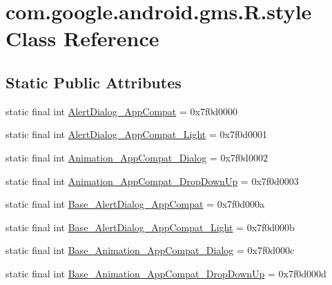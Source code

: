 \hypertarget{classcom_1_1google_1_1android_1_1gms_1_1R_1_1style}{}\section{com.\+google.\+android.\+gms.\+R.\+style Class Reference}
\label{classcom_1_1google_1_1android_1_1gms_1_1R_1_1style}
\subsection*{Static Public Attributes}
\begin{DoxyCompactItemize}
\item 
static final int \mbox{\hyperlink{classcom_1_1google_1_1android_1_1gms_1_1R_1_1style_a655dde196110073187ff00b97ed4ad4a}{Alert\+Dialog\+\_\+\+App\+Compat}} = 0x7f0d0000
\item 
static final int \mbox{\hyperlink{classcom_1_1google_1_1android_1_1gms_1_1R_1_1style_afb60526c8ffabe0efffdf437fb9e2977}{Alert\+Dialog\+\_\+\+App\+Compat\+\_\+\+Light}} = 0x7f0d0001
\item 
static final int \mbox{\hyperlink{classcom_1_1google_1_1android_1_1gms_1_1R_1_1style_a4757a69c9c723414d81b337acc35c729}{Animation\+\_\+\+App\+Compat\+\_\+\+Dialog}} = 0x7f0d0002
\item 
static final int \mbox{\hyperlink{classcom_1_1google_1_1android_1_1gms_1_1R_1_1style_aa89ffcc7d49bea616677fe633b17c625}{Animation\+\_\+\+App\+Compat\+\_\+\+Drop\+Down\+Up}} = 0x7f0d0003
\item 
static final int \mbox{\hyperlink{classcom_1_1google_1_1android_1_1gms_1_1R_1_1style_a880e9945afa2cc56928e60ce1dc31da6}{Base\+\_\+\+Alert\+Dialog\+\_\+\+App\+Compat}} = 0x7f0d000a
\item 
static final int \mbox{\hyperlink{classcom_1_1google_1_1android_1_1gms_1_1R_1_1style_acc30d307172ee1bb23928ab78163dddd}{Base\+\_\+\+Alert\+Dialog\+\_\+\+App\+Compat\+\_\+\+Light}} = 0x7f0d000b
\item 
static final int \mbox{\hyperlink{classcom_1_1google_1_1android_1_1gms_1_1R_1_1style_a5c2aff19bc8a534c555e7b4bd31cbc37}{Base\+\_\+\+Animation\+\_\+\+App\+Compat\+\_\+\+Dialog}} = 0x7f0d000c
\item 
static final int \mbox{\hyperlink{classcom_1_1google_1_1android_1_1gms_1_1R_1_1style_a12a68da4045d3a67430de2f55f6fd392}{Base\+\_\+\+Animation\+\_\+\+App\+Compat\+\_\+\+Drop\+Down\+Up}} = 0x7f0d000d
\item 

\end{DoxyCompactItemize}

